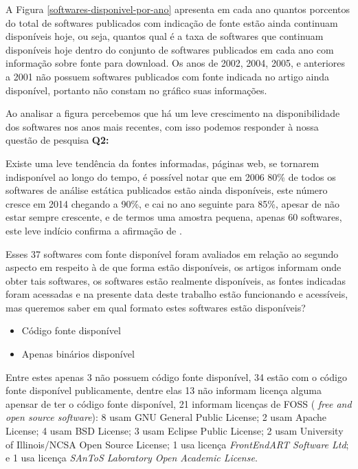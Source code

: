 A Figura \ref{softwares-disponivel-por-ano} apresenta em cada ano quantos
porcentos do total de softwares publicados com indicação de fonte estão ainda continuam
disponíveis hoje, ou seja, quantos qual é a taxa de softwares que continuam
disponíveis hoje dentro do conjunto de softwares publicados em cada ano com
informação sobre fonte para download.  Os anos de 2002, 2004, 2005, e
anteriores a 2001 não possuem softwares publicados com fonte indicada no artigo
ainda disponível, portanto não constam no gráfico suas informações.

Ao analisar a figura percebemos que há um leve crescimento na disponibilidade
dos softwares nos anos mais recentes, com isso podemos responder à nossa
questão de pesquisa {\bf Q2:} \QuestaoDois

Existe uma leve tendência da fontes informadas, páginas web, se tornarem
indisponível ao longo do tempo, é possível notar que em 2006 80\% de todos os
softwares de análise estática publicados estão ainda disponíveis, este número
cresce em 2014 chegando a 90\%, e cai no ano seguinte para 85\%, apesar de não
estar sempre crescente, e de termos uma amostra pequena, apenas 60 softwares,
este leve indício confirma a afirmação de .

Esses 37 softwares com fonte disponível foram avaliados em relação ao segundo
aspecto em respeito à de que forma estão disponíveis, os artigos informam onde
obter tais softwares, os softwares estão realmente disponíveis, as fontes
indicadas foram acessadas e na presente data deste trabalho estão funcionando e
acessíveis, mas queremos saber em qual formato estes softwares estão
disponíveis?

\begin{itemize}
  \item Código fonte disponível
  \item Apenas binários disponível
\end{itemize}

Entre estes apenas 3 não possuem código fonte disponível, 34 estão com o código
fonte disponível publicamente, dentre elas 13 não informam licença alguma
apensar de ter o código fonte disponível, 21 informam licenças de FOSS ({\it
free and open source software}):
8 usam GNU General Public License;
2 usam Apache License;
4 usam BSD License;
3 usam Eclipse Public License;
2 usam University of Illinois/NCSA Open Source License;
1 usa licença {\it FrontEndART Software Ltd}; e
1 usa licença {\it SAnToS Laboratory Open Academic License}.


